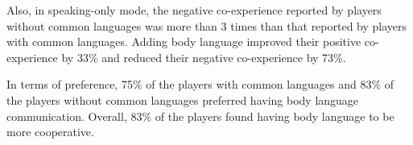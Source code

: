 Also, in speaking-only mode, the negative co-experience reported by players without common languages was more than 3 times than that reported by players with common languages. Adding body language improved their positive co-experience by 33\% and reduced their negative co-experience by 73\%. 

In terms of preference, 75\% of the players with common languages and 83\% of the players without common languages preferred having body language communication. Overall, 83\% of the players found having body language to be more cooperative.





